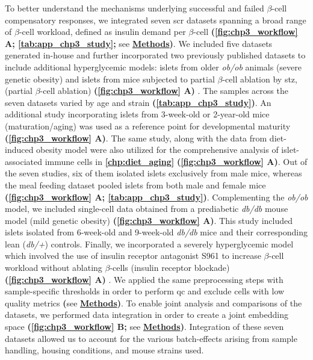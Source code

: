 \par To better understand the mechanisms underlying successful and failed $\beta$-cell compensatory responses, we integrated seven \gls{scr} datasets spanning a broad range of $\beta$-cell workload, defined as insulin demand per $\beta$-cell \textbf{(\autoref{fig:chp3_workflow} A; \autoref{tab:app_chp3_study};} see \hyperref[subsubsec:met_chp3_data]{\textbf{Methods}}\textbf{)}. We included five datasets generated in-house and further incorporated two previously published datasets to include additional hyperglycemic models: islets from older \textit{ob/ob} animals (severe genetic obesity) and islets from mice subjected to partial $\beta$-cell ablation by \gls{stz}, (partial $\beta$-cell ablation) \textbf{(\autoref{fig:chp3_workflow} A)} \textbf{\cite{chung_endocrine-exocrine_2020,sachs_targeted_2020}}. The samples across the seven datasets varied by age and strain \textbf{(\autoref{tab:app_chp3_study})}. An additional study incorporating islets from 3-week-old or 2-year-old mice (maturation/aging) was used as a reference point for developmental maturity \textbf{(\autoref{fig:chp3_workflow} A)}. The same study, along with the data from diet-induced obesity model were also utilized for the comprehensive analysis of islet-associated immune cells in \textbf{\autoref{chp:diet_aging}} \textbf{(\autoref{fig:chp3_workflow} A)}. Out of the seven studies, six of them isolated islets exclusively from male mice, whereas the meal feeding dataset pooled islets from both male and female mice \textbf{(\autoref{fig:chp3_workflow} A; \autoref{tab:app_chp3_study})}. Complementing the \textit{ob/ob} model, we included single-cell data obtained from a prediabetic \textit{db/db} mouse model (mild genetic obesity) \textbf{(\autoref{fig:chp3_workflow} A)}. This study included islets isolated from 6-week-old and 9-week-old \textit{db/db} mice and their corresponding lean (\textit{db/+}) controls. Finally, we incorporated a severely hyperglycemic model which involved the use of insulin receptor antagonist S961 to increase $\beta$-cell workload without ablating $\beta$-cells (insulin receptor blockade) \textbf{(\autoref{fig:chp3_workflow} A)} \textbf{\cite{wortham_metabolic_2024}}. We applied the same preprocessing steps with sample-specific thresholds in order to perform \gls{qc} and exclude cells with low quality metrics \textbf{(}see \hyperref[subsubsec:met_chp3_preprocessing]{\textbf{Methods}}\textbf{)}. To enable joint analysis and comparisons of the datasets, we performed data integration in order to create a joint embedding space \textbf{(\autoref{fig:chp3_workflow} B;} see \hyperref[subsubsec:met_chp3_integration]{\textbf{Methods}}\textbf{)}. Integration of these seven datasets allowed us to account for the various batch-effects arising from sample handling, housing conditions, and mouse strains used.\\



